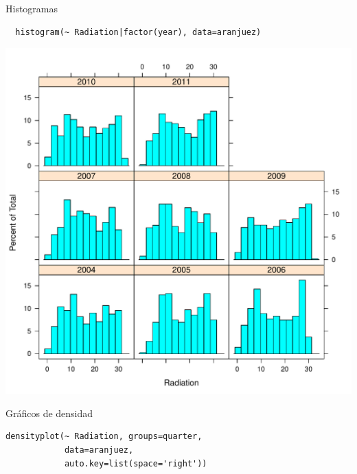\documentclass[xcolor={usenames,svgnames,dvipsnames}]{beamer}
\begin{document}
\begin{frame}[fragile,label=sec-2-1-44]{Histogramas}
 \lstset{language=R,label= ,caption= ,numbers=none}
\begin{lstlisting}
  histogram(~ Radiation|factor(year), data=aranjuez)
\end{lstlisting}
\end{frame}

\begin{frame}[label=sec-2-1-45]{}
\includegraphics[width=.9\linewidth]{figs/histogram.pdf}
\end{frame}

\begin{frame}[fragile,label=sec-2-1-46]{Gráficos de densidad}
 \lstset{language=R,label= ,caption= ,numbers=none}
\begin{lstlisting}
densityplot(~ Radiation, groups=quarter,
            data=aranjuez,
            auto.key=list(space='right'))
\end{lstlisting}
\end{frame}
\end{document}
